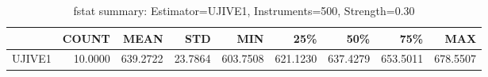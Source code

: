 \begin{table}[ht]
\centering
\caption{fstat summary: Estimator=UJIVE1, Instruments=500, Strength=0.30}
\begin{tabular}{lrrrrrrrr}
\toprule
 & COUNT & MEAN & STD & MIN & 25\% & 50\% & 75\% & MAX \\
\midrule
UJIVE1 & 10.0000 & 639.2722 & 23.7864 & 603.7508 & 621.1230 & 637.4279 & 653.5011 & 678.5507 \\
\bottomrule
\end{tabular}
\end{table}
